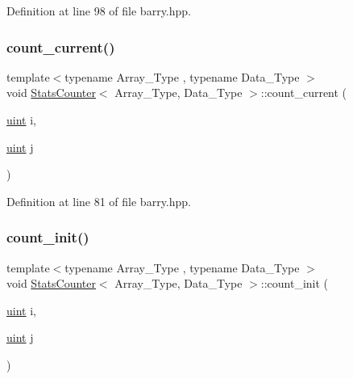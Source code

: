 Definition at line 98 of file barry.\+hpp.

\mbox{\label{classbarry_1_1_stats_counter_ab81166f7cb67eeaecc469016d237019a}} 
\subsubsection{\texorpdfstring{count\+\_\+current()}{count\_current()}}
{\footnotesize\ttfamily template$<$typename Array\+\_\+\+Type , typename Data\+\_\+\+Type $>$ \\
void \hyperlink{classbarry_1_1_stats_counter}{Stats\+Counter}$<$ Array\+\_\+\+Type, Data\+\_\+\+Type $>$\+::count\+\_\+current (\begin{DoxyParamCaption}\item[{\hyperlink{namespacebarry_a11dfc53ddb4672278319aa04f1e09a6c}{uint}}]{i,  }\item[{\hyperlink{namespacebarry_a11dfc53ddb4672278319aa04f1e09a6c}{uint}}]{j }\end{DoxyParamCaption})\hspace{0.3cm}{\ttfamily [inline]}}



Definition at line 81 of file barry.\+hpp.

\mbox{\label{classbarry_1_1_stats_counter_a19bd5936619e190c0d8918b4f343922e}} 
\subsubsection{\texorpdfstring{count\+\_\+init()}{count\_init()}}
{\footnotesize\ttfamily template$<$typename Array\+\_\+\+Type , typename Data\+\_\+\+Type $>$ \\
void \hyperlink{classbarry_1_1_stats_counter}{Stats\+Counter}$<$ Array\+\_\+\+Type, Data\+\_\+\+Type $>$\+::count\+\_\+init (\begin{DoxyParamCaption}\item[{\hyperlink{namespacebarry_a11dfc53ddb4672278319aa04f1e09a6c}{uint}}]{i,  }\item[{\hyperlink{namespacebarry_a11dfc53ddb4672278319aa04f1e09a6c}{uint}}]{j }\end{DoxyParamCaption})\hspace{0.3cm}{\ttfamily [inline]}}



